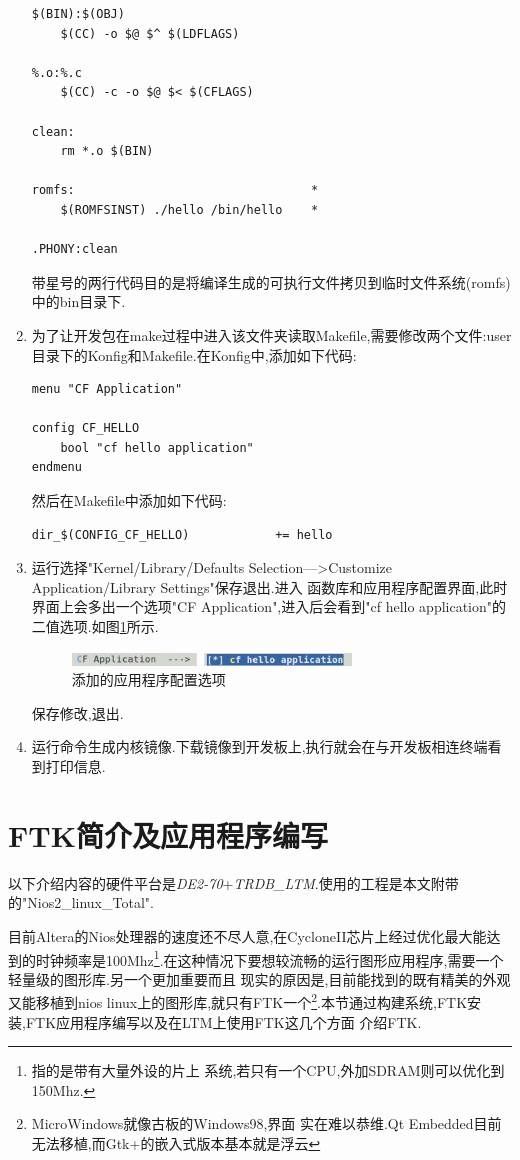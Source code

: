 \documentclass[12pt,a4paper,titlepage]{article}
\begin{document}
\begin{enumerate}
\begin{verbatim}
$(BIN):$(OBJ)
    $(CC) -o $@ $^ $(LDFLAGS)

%.o:%.c
    $(CC) -c -o $@ $< $(CFLAGS)

clean:
    rm *.o $(BIN)

romfs:                                 *
    $(ROMFSINST) ./hello /bin/hello    *

.PHONY:clean
\end{verbatim}
带星号的两行代码目的是将编译生成的可执行文件拷贝到临时文件系统(romfs)中的bin目录下.
\item 为了让开发包在make过程中进入该文件夹读取Makefile,需要修改两个文件:user目录下的Konfig和Makefile.在Konfig中,添加如下代码:
\begin{verbatim}
menu "CF Application"

config CF_HELLO
    bool "cf hello application"
endmenu
\end{verbatim}
然后在Makefile中添加如下代码:
\begin{verbatim}
dir_$(CONFIG_CF_HELLO)            += hello
\end{verbatim}
\item 运行选择"Kernel/Library/Defaults Selection--->Customize Application/Library Settings"保存退出.进入
函数库和应用程序配置界面,此时界面上会多出一个选项"CF Application",进入后会看到"cf hello application"的二值选项.如图\ref{f_appcf}所示.
\begin{figure}[!bthp]
\centering
\includegraphics[width=0.7\textwidth]{pic/f_app_cf.eps}
\caption{添加的应用程序配置选项\label{f_appcf}}
\end{figure}
保存修改,退出.
\item 运行命令生成内核镜像.下载镜像到开发板上,执行就会在与开发板相连终端看到打印信息.
\end{enumerate}
\setcounter{footnote}{0}
\newpage{}
\section{FTK简介及应用程序编写}
以下介绍内容的硬件平台是\textit{DE2-70}+\textit{TRDB\_LTM}.使用的工程是本文附带的"Nios2\_\-linux\_Total".

目前Altera的Nios处理器的速度还不尽人意,在CycloneII芯片上经过优化最大能达到的时钟频率是100Mhz\footnote{指的是带有大量外设的片上
系统,若只有一个CPU,外加SDRAM则可以优化到150Mhz.}.在这种情况下要想较流畅的运行图形应用程序,需要一个轻量级的图形库.另一个更加重要而且
现实的原因是,目前能找到的既有精美的外观又能移植到nios linux上的图形库,就只有FTK一个\footnote{MicroWindows就像古板的Windows98,界面
实在难以恭维.Qt Embedded目前无法移植,而Gtk+的嵌入式版本基本就是浮云}.本节通过构建系统,FTK安装,FTK应用程序编写以及在LTM上使用FTK这几个方面
介绍FTK.
\end{document}
